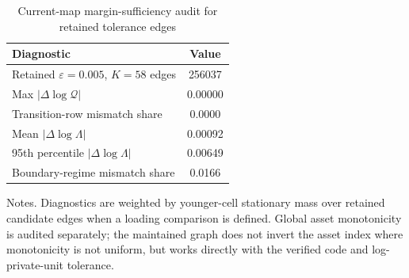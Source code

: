 \begin{table}[H]
\centering
\caption{Current-map margin-sufficiency audit for retained tolerance edges}
\label{tab:margin-sufficiency-audit}
\footnotesize
\begin{tabular}{lc}
\toprule
Diagnostic & Value \\
\midrule
Retained $\varepsilon=0.005$, $K=58$ edges & 256037 \\
Max $|\Delta\log\mathcal Q|$ & 0.00000 \\
Transition-row mismatch share & 0.0000 \\
Mean $|\Delta\log\Lambda|$ & 0.00092 \\
95th percentile $|\Delta\log\Lambda|$ & 0.00649 \\
Boundary-regime mismatch share & 0.0166 \\
\bottomrule
\end{tabular}
\begin{minipage}{0.92\textwidth}
\footnotesize Notes. Diagnostics are weighted by younger-cell stationary mass over retained candidate edges when a loading comparison is defined. Global asset monotonicity is audited separately; the maintained graph does not invert the asset index where monotonicity is not uniform, but works directly with the verified code and log-private-unit tolerance.
\end{minipage}
\end{table}
